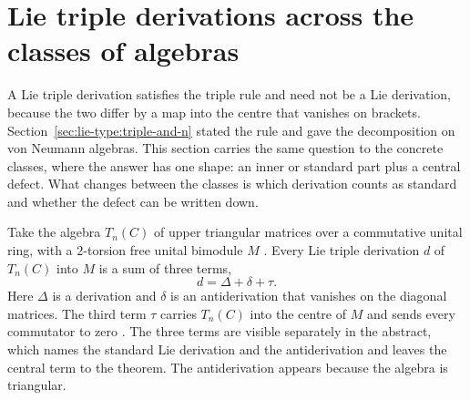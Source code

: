 \section{Lie triple derivations across the classes of algebras}\label{sec:lie-type:triple-across-classes}

A Lie triple derivation satisfies the triple rule and need not be a Lie
derivation, because the two differ by a map into the centre that vanishes on
brackets. Section~\ref{sec:lie-type:triple-and-n} stated the rule and gave the
decomposition on von Neumann algebras. This section carries the same question
to the concrete classes, where the answer has one shape: an inner or standard
part plus a central defect. What changes between the classes is which
derivation counts as standard and whether the defect can be written down.

Take the algebra $T_{n}(C)$ of upper triangular matrices over a commutative
unital ring, with a $2$-torsion free unital bimodule $M$ \cite[Theorem~2.4,
p.~823]{Benkovic2011TripleTriangular}. Every Lie triple derivation $d$ of
$T_{n}(C)$ into $M$ is a sum of three terms, \begin{equation*} d = \Delta +
\delta + \tau . \end{equation*} Here $\Delta$ is a derivation and $\delta$ is
an antiderivation that vanishes on the diagonal matrices. The third term
$\tau$ carries $T_{n}(C)$ into the centre of $M$ and sends every commutator to
zero \cite[Theorem~2.4, p.~823]{Benkovic2011TripleTriangular}. The three terms
are visible separately in the abstract, which names the standard Lie
derivation and the antiderivation and leaves the central term to the theorem.
The antiderivation appears because the algebra is triangular.

